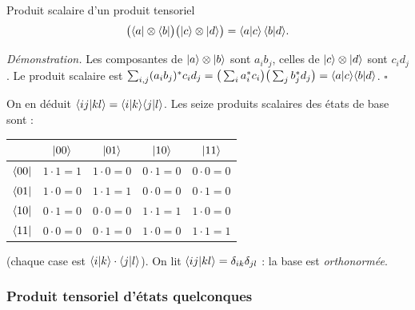 \begin{resultat}{Produit scalaire d'un produit tensoriel}
\[
  \big(\langle a|\otimes\langle b|\big)\big(|c\rangle\otimes|d\rangle\big)=\langle a|c\rangle\,\langle b|d\rangle.
\]
\end{resultat}

\emph{Démonstration.} Les composantes de $|a\rangle\otimes|b\rangle$ sont $a_ib_j$, celles de
$|c\rangle\otimes|d\rangle$ sont $c_id_j$. Le produit scalaire est
$\sum_{i,j}(a_ib_j)^*c_id_j=\big(\sum_ia_i^*c_i\big)\big(\sum_jb_j^*d_j\big)=\langle a|c\rangle\langle b|d\rangle$.
\hfill$\square$

On en déduit $\langle ij|kl\rangle=\langle i|k\rangle\langle j|l\rangle$. Les seize produits scalaires
des états de base sont :
\begin{center}
\renewcommand{\arraystretch}{1.3}
\begin{tabular}{@{}c|cccc@{}}
 & $|00\rangle$ & $|01\rangle$ & $|10\rangle$ & $|11\rangle$ \\
\hline
$\langle 00|$ & $1\cdot1=1$ & $1\cdot0=0$ & $0\cdot1=0$ & $0\cdot0=0$ \\
$\langle 01|$ & $1\cdot0=0$ & $1\cdot1=1$ & $0\cdot0=0$ & $0\cdot1=0$ \\
$\langle 10|$ & $0\cdot1=0$ & $0\cdot0=0$ & $1\cdot1=1$ & $1\cdot0=0$ \\
$\langle 11|$ & $0\cdot0=0$ & $0\cdot1=0$ & $1\cdot0=0$ & $1\cdot1=1$ \\
\end{tabular}
\end{center}
(chaque case est $\langle i|k\rangle\cdot\langle j|l\rangle$). On lit $\langle ij|kl\rangle=\delta_{ik}\delta_{jl}$ :
la base est \emph{orthonormée}.

\subsubsection{Produit tensoriel d'états quelconques}

